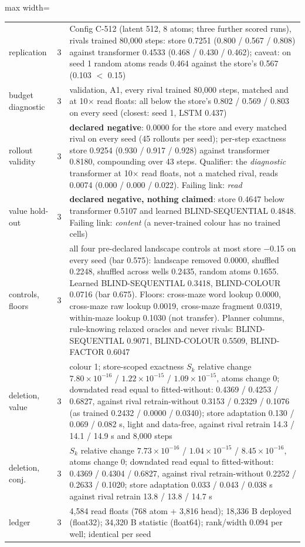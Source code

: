 \documentclass{article} %
\newcommand{\sci}[2]{\ensuremath{#1\times10^{#2}}}
\begin{document}
\begin{table}[h]
\begin{adjustbox}{max width=\linewidth}
\begin{tabular}{p{1.9cm}p{1.2cm}p{10.0cm}}
\quad replication & 3 & Config C-512 (latent 512, 8 atoms; three further scored runs), rivals trained 80,000 steps: store 0.7251 (0.800 / 0.567 / 0.808) against transformer 0.4533 (0.468 / 0.430 / 0.462); caveat: on seed 1 random atoms reads 0.464 against the store's 0.567 (0.103 $<$ 0.15) \\
\quad budget diagnostic & 3 & validation, A1, every rival trained 80,000 steps, matched and at 10$\times$ read floats: all below the store's 0.802 / 0.569 / 0.803 on every seed (closest: seed 1, LSTM 0.437) \\
rollout validity & 3 & \textbf{declared negative}: 0.0000 for the store and every matched rival on every seed (45 rollouts per seed); per-step exactness store 0.9254 (0.930 / 0.917 / 0.928) against transformer 0.8180, compounding over 43 steps. Qualifier: the \emph{diagnostic} transformer at 10$\times$ read floats, not a matched rival, reads 0.0074 (0.000 / 0.000 / 0.022). Failing link: \emph{read} \\
value hold-out & 3 & \textbf{declared negative, nothing claimed}: store 0.4647 below transformer 0.5107 and learned BLIND-SEQUENTIAL 0.4848. Failing link: \emph{content} (a never-trained colour has no trained cells) \\
controls, floors & 3 & all four pre-declared landscape controls at most store $-$0.15 on every seed (bar 0.575): landscape removed 0.0000, shuffled 0.2248, shuffled across wells 0.2435, random atoms 0.1655. Learned BLIND-SEQUENTIAL 0.3418, BLIND-COLOUR 0.0716 (bar 0.675). Floors: cross-maze word lookup 0.0000, cross-maze raw lookup 0.0019, cross-maze fragment 0.0319, within-maze lookup 0.1030 (not transfer). Planner columns, rule-knowing relaxed oracles and never rivals: BLIND-SEQUENTIAL 0.9071, BLIND-COLOUR 0.5509, BLIND-FACTOR 0.6047 \\
deletion, value & 3 & colour 1; store-scoped exactness $S_k$ relative change \sci{7.80}{-16} / \sci{1.22}{-15} / \sci{1.09}{-15}, atoms change 0; downdated read equal to fitted-without: 0.4369 / 0.4253 / 0.6827, against rival retrain-without 0.3153 / 0.2329 / 0.1076 (as trained 0.2432 / 0.0000 / 0.0340); store adaptation 0.130 / 0.069 / 0.082 s, light and data-free, against rival retrain 14.3 / 14.1 / 14.9 s and 8,000 steps \\
deletion, conj. & 3 & $S_k$ relative change \sci{7.73}{-16} / \sci{1.04}{-15} / \sci{8.45}{-16}, atoms change 0; downdated read equal to fitted-without: 0.4369 / 0.4304 / 0.6827, against rival retrain-without 0.2252 / 0.2633 / 0.1020; store adaptation 0.033 / 0.043 / 0.038 s against rival retrain 13.8 / 13.8 / 14.7 s \\
ledger & 3 & 4,584 read floats (768 atom + 3,816 head); 18,336 B deployed (float32); 34,320 B statistic (float64); rank/width 0.094 per well; identical per seed \\
\bottomrule
\end{tabular}\end{adjustbox}
\end{table}
\end{document}
